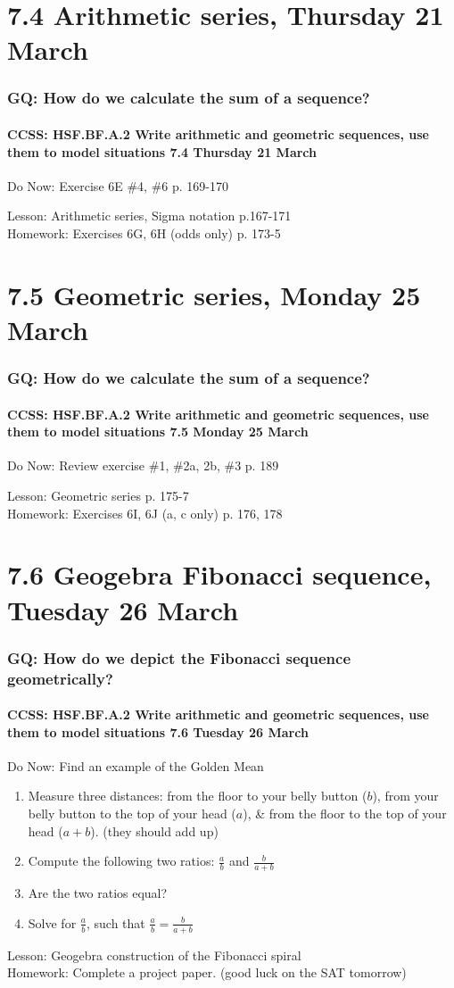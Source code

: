 \documentclass{beamer}
\begin{document}
  \section{7.4 Arithmetic series, Thursday 21 March}
    \frame
    {
      \frametitle{GQ: How do we calculate the sum of a sequence?}
      \framesubtitle{CCSS: HSF.BF.A.2 Write arithmetic and geometric sequences, use them to model situations \hfill \alert{7.4 Thursday 21 March}}

      \begin{block}{Do Now: Exercise 6E \#4, \#6 p. 169-170}
      \end{block}
      Lesson: Arithmetic series, Sigma notation p.167-171\\[1cm]
      Homework: Exercises 6G, 6H (odds only) p.  173-5
    }

  \section{7.5 Geometric series, Monday 25 March}
    \frame
    {
      \frametitle{GQ: How do we calculate the sum of a sequence?}
      \framesubtitle{CCSS: HSF.BF.A.2 Write arithmetic and geometric sequences, use them to model situations \hfill \alert{7.5 Monday 25 March}}

      \begin{block}{Do Now: Review exercise \#1, \#2a, 2b, \#3 p. 189}
      \end{block}
      Lesson: Geometric series p. 175-7\\[1cm]
      Homework: Exercises 6I, 6J (a, c only) p.  176, 178
    }

  \section{7.6 Geogebra Fibonacci sequence, Tuesday 26 March}
    \frame
    {
      \frametitle{GQ: How do we depict the Fibonacci sequence geometrically?}
      \framesubtitle{CCSS: HSF.BF.A.2 Write arithmetic and geometric sequences, use them to model situations \hfill \alert{7.6 Tuesday 26 March}}

      \begin{block}{Do Now: Find an example of the Golden Mean}
        \begin{enumerate}
          \item Measure three distances:  from the floor to your belly button ($b$), from your belly button to the top of your head ($a$), \& from the floor to the top of your head ($a+b$). (they should add up)
          \item Compute the following two ratios: $\frac{a}{b}$ and $\frac{b}{a+b}$
          \item Are the two ratios equal?
          \item Solve for $\frac{a}{b}$, such that $\frac{a}{b} = \frac{b}{a+b}$
      \end{enumerate}
      \end{block}
      Lesson: Geogebra construction of the Fibonacci spiral \\
      Homework: Complete a project paper. (good luck on the SAT tomorrow)
    }
\end{document}
